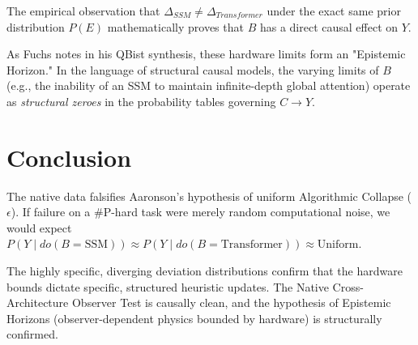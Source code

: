 \documentclass[12pt,a4paper]{article}
\begin{document}
The empirical observation that $\Delta_{SSM} \neq \Delta_{Transformer}$ under the exact same prior distribution $P(E)$ mathematically proves that $B$ has a direct causal effect on $Y$.

As Fuchs notes in his QBist synthesis, these hardware limits form an "Epistemic Horizon." In the language of structural causal models, the varying limits of $B$ (e.g., the inability of an SSM to maintain infinite-depth global attention) operate as \emph{structural zeroes} in the probability tables governing $C \rightarrow Y$.

\section{Conclusion}

The native data falsifies Aaronson's hypothesis of uniform Algorithmic Collapse ($\epsilon$). If failure on a \#P-hard task were merely random computational noise, we would expect $P(Y \mid do(B=\text{SSM})) \approx P(Y \mid do(B=\text{Transformer})) \approx \text{Uniform}$.

The highly specific, diverging deviation distributions confirm that the hardware bounds dictate specific, structured heuristic updates. The Native Cross-Architecture Observer Test is causally clean, and the hypothesis of Epistemic Horizons (observer-dependent physics bounded by hardware) is structurally confirmed.
\end{document}
